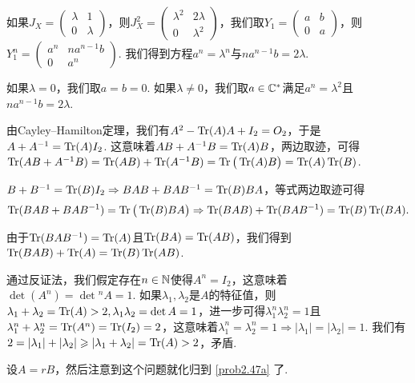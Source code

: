 \begin{solution}
  如果$J_X=\begin{pmatrix}
    \lambda & 1\\
    0 & \lambda
  \end{pmatrix}$，则$J_X^2=\begin{pmatrix}
    \lambda^2 & 2\lambda \\
    0 & \lambda^2
  \end{pmatrix}$，我们取$Y_1=\begin{pmatrix}
    a & b \\
    0 & a
  \end{pmatrix}$，则$Y_1^n=\begin{pmatrix}
    a^n & na^{n-1}b \\
    0 & a^n
  \end{pmatrix}$. 我们得到方程$a^n=\lambda^n$与$na^{n-1}b=2\lambda$.

  如果$\lambda=0$，我们取$a=b=0$. 如果$\lambda\ne0$，我们取$a\in\mathbb C^\ast$满足$a^n=\lambda^2$且$na^{n-1}b=2\lambda$.
\end{solution}

\begin{solution}
  \begin{inparaenum}[(a)]
    \item 由Cayley--Hamilton定理，我们有$A^2-\operatorname{Tr}(A)A+I_2=O_2$，于是$A+A^{-1}=\operatorname{Tr}(A)I_2$. 这意味着$AB+A^{-1}B=\operatorname{Tr}(A)B$，两边取迹，可得$\operatorname{Tr}(AB+A^{-1}B)=\operatorname{Tr}(AB)+\operatorname{Tr}(A^{-1}B)
        =\operatorname{Tr}\big(\operatorname{Tr}(A)B\big)=\operatorname{Tr}(A)\operatorname{Tr}(B)$.

    \item $B+B^{-1}=\operatorname{Tr}(B)I_2\Rightarrow BAB+BAB^{-1}=\operatorname{Tr}(B)BA$，等式两边取迹可得
        \[
          \operatorname{Tr}(BAB + BAB^{-1}) = \operatorname{Tr}\big( \operatorname{Tr}(B)BA \big) \Rightarrow \operatorname{Tr}(BAB) + \operatorname{Tr}(BAB^{-1}) = \operatorname{Tr}(B)\operatorname{Tr}(BA).
        \]

        由于$\operatorname{Tr}(BAB^{-1})=\operatorname{Tr}(A)$且$\operatorname{Tr}(BA)=\operatorname{Tr}(AB)$，我们得到$\operatorname{Tr}(BAB)+\operatorname{Tr}(A)=\operatorname{Tr}(B)\operatorname{Tr}(AB)$.
  \end{inparaenum}
\end{solution}

\begin{solution}
  \begin{inparaenum}[(a)]
    \item 通过反证法，我们假定存在$n\in\mathbb N$使得$A^n=I_2$，这意味着$\det(A^n)=\det{}^nA=1$. 如果$\lambda_1,\lambda_2$是$A$的特征值，则$\lambda_1+\lambda_2=\operatorname{Tr}(A)>2,
        \lambda_1\lambda_2=\det A=1$，进一步可得$\lambda_1^n\lambda_2^n=1$且
        $\lambda_1^n+\lambda_2^n=\operatorname{Tr}(A^n)=\operatorname{Tr}(I_2)=2$，这意味着$\lambda_1^n=\lambda_2^n=1\Rightarrow
        |\lambda_1|=|\lambda_2|=1$. 我们有$2=|\lambda_1|+|\lambda_2|\geqslant|\lambda_1+\lambda_2|=\operatorname{Tr}(A)>2$，矛盾.

    \item 设$A=rB$，然后注意到这个问题就化归到 \ref{prob2.47a} 了.
  \end{inparaenum}
\end{solution}

